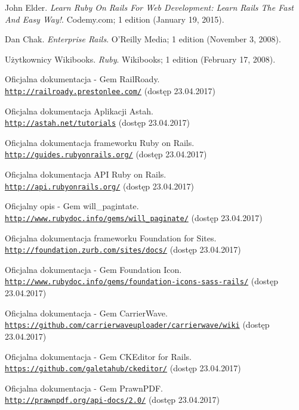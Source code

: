 \documentclass[openright]{xmgr}
\begin{document}
\begin{thebibliography}{9}
John Elder.
\textit{Learn Ruby On Rails For Web Development: Learn Rails The Fast And Easy Way!}. 
Codemy.com; 1 edition (January 19, 2015).
 
Dan Chak.
\textit{Enterprise Rails}. 
O'Reilly Media; 1 edition (November 3, 2008).

Użytkownicy Wikibooks.
\textit{Ruby}. 
Wikibooks; 1 edition (February 17, 2008).

Oficjalna dokumentacja - Gem RailRoady.
\\\texttt{\url{http://railroady.prestonlee.com/}} (dostęp 23.04.2017)

Oficjalna dokumentacja Aplikacji Astah.
\\\texttt{\url{http://astah.net/tutorials}} (dostęp 23.04.2017)

Oficjalna dokumentacja frameworku Ruby on Rails.
\\\texttt{\url{http://guides.rubyonrails.org/}} (dostęp 23.04.2017)

Oficjalna dokumentacja API Ruby on Rails. 
\\\texttt{\url{http://api.rubyonrails.org/}} (dostęp 23.04.2017)

Oficjalny opis - Gem will\_pagintate. 
\\\texttt{\url{http://www.rubydoc.info/gems/will_paginate/}} (dostęp 23.04.2017)

Oficjalna dokumentacja frameworku Foundation for Sites. 
\\\texttt{\url{http://foundation.zurb.com/sites/docs/}} (dostęp 23.04.2017)

Oficjalna dokumentacja - Gem Foundation Icon.
\\\texttt{\url{http://www.rubydoc.info/gems/foundation-icons-sass-rails/}} (dostęp 23.04.2017)

Oficjalna dokumentacja - Gem CarrierWave.
\\\texttt{\url{https://github.com/carrierwaveuploader/carrierwave/wiki}} (dostęp 23.04.2017)

Oficjalna dokumentacja - Gem CKEditor for Rails.
\\\texttt{\url{https://github.com/galetahub/ckeditor/}} (dostęp 23.04.2017)

Oficjalna dokumentacja - Gem PrawnPDF.
\\\texttt{\url{http://prawnpdf.org/api-docs/2.0/}} (dostęp 23.04.2017)


\end{thebibliography}
\end{document}
